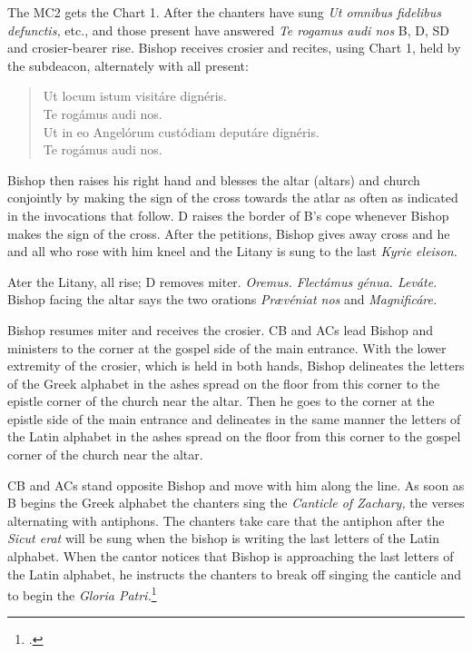 \documentclass[letterpaper]{report}
\begin{document}
{\rubric The MC2 gets the Chart 1. After the chanters have sung \textit{Ut
omnibus fidelibus defunctis,} etc., and those present have answered \textit{Te
rogamus audi nos} B, D, SD and crosier-bearer rise. Bishop receives crosier and
recites, using Chart 1, held by the subdeacon, alternately with all present:

\begin{quote}
    \vbar Ut locum istum visitáre dignéris.\\
    \rbar Te rogámus audi nos.\\
    \vbar Ut in eo Angelórum custódiam deputáre dignéris.\\
    \rbar Te rogámus audi nos.\\
\end{quote}

Bishop then raises his right hand and blesses the altar (altars) and church
conjointly by making the sign of the cross towards the atlar as often as
indicated in the invocations that follow. D raises the border of B's cope
whenever Bishop makes the sign of the cross. After the petitions, Bishop gives away cross
and he and all who rose with him kneel and the Litany is sung to the last
\textit{Kyrie eleison.}

\rubric Ater the Litany, all rise; D removes miter. \textit{Oremus. Flectámus
génua. Leváte.} Bishop facing the altar says the two orations \textit{Pr\ae véniat
nos} and \textit{Magnificáre.}

\rubric Bishop resumes miter and receives the crosier. CB and ACs lead Bishop and
ministers to the corner at the gospel side of the main entrance. With the lower
extremity of the crosier, which is held in both hands, Bishop delineates the letters
of the Greek alphabet in the ashes spread on the floor from this corner to the
epistle corner of the church near the altar. Then he goes to the corner at the
epistle side of the main entrance and delineates in the same manner the letters
of the Latin alphabet in the ashes spread on the floor from this corner to the
gospel corner of the church near the altar.

CB and ACs stand opposite Bishop and move with him along the line. As soon as B
begins the Greek alphabet the chanters sing the \textit{Canticle of Zachary,}
the verses alternating with antiphons. The chanters take care that the antiphon
after the \textit{Sicut erat} will be sung when the bishop is writing the last
letters of the Latin alphabet. When the cantor notices that Bishop is approaching
the last letters of the Latin alphabet, he instructs the chanters to break off
singing the canticle and to begin the \textit{Gloria Patri.}\footcite[][p.
56.]{consecranda}

}
\end{document}
